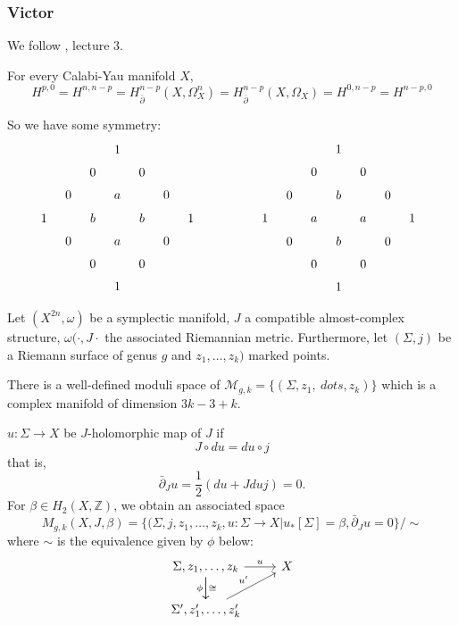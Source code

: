 \documentclass{article}
\numberwithin{equation}{section}
\newcommand{\Z}{\mathbb{Z}}
\newcommand{\Mc}{\mathcal{M}}
\begin{document}
\subsubsection{Victor}
We follow \cite{aroux}, lecture 3.
\begin{remark}
	For every Calabi-Yau manifold $X$,
	\[H^{p,0}= H^{n,n-p}=H^{n-p}_{\bar\partial}(X,\Omega^n_X)=H_{\bar\partial}^{n-p}(X,\Omega_X)=H^{0,n-p}=H^{n-p,0}\]
\end{remark}
So we have some symmetry:
\[\begin{tikzcd}[column sep=tiny,row sep=tiny]
	&&&1&&&&\\
	&&0&&0&&\\
	&0&&a&&0\\
	1&&b&&b&&1\\
	&0&&a&&0\\
	&&0&&0\\
	&&&1
\end{tikzcd}\qquad\qquad
\begin{tikzcd}[column sep=tiny,row sep=tiny]
	&&&1&&&&\\
	&&0&&0&&\\
	&0&&b&&0\\
	1&&a&&a&&1\\
	&0&&b&&0\\
	&&0&&0\\
	&&&1
\end{tikzcd}\]
\begin{defn}
	Let $(X^{2n},\omega)$ be a symplectic manifold, $J$ a compatible almost-complex structure, $\omega(\cdot,J\cdot$ the associated Riemannian metric. Furthermore, let $(\Sigma, j)$ be a Riemann surface of genus $g$ and $z_1,\ldots,z_k)$ marked points.
\end{defn}
\begin{remark}
	There is a well-defined moduli space of $\Mc_{g,k}=\{(\Sigma,z_1,\ dots,z_k)\}$ which is a complex manifold of dimension $3k-3+k$.
\end{remark}

\begin{defn}
	$u:\Sigma\to X$ be $J$-holomorphic map of $J$ if
	\[J\circ du=du\circ j\]
	that is,
	\[\bar\partial_Ju=\frac{1}{2}(du+Jduj)=0.\]
	For $\beta\in H_2(X,\Z)$, we obtain an associated space
	\[M_{g,k}(X,J,\beta)=\{(\Sigma,j,z_1,\ldots,z_k,u:\Sigma\to X|u_*[\Sigma]=\beta,\bar\partial_Ju=0\}/\sim\]
	where $\sim$ is the equivalence given by $\phi$ below:
	\[\begin{tikzcd}
		\Sigma,z_1,\ldots,z_k\arrow[r,"u"]\arrow[d,"\phi",swap]\arrow[d,"\cong"]&X\\
		\Sigma',z_1',\ldots,z_k'\arrow[ur,"u'"]
	\end{tikzcd}\]
\end{defn}


\end{document}

